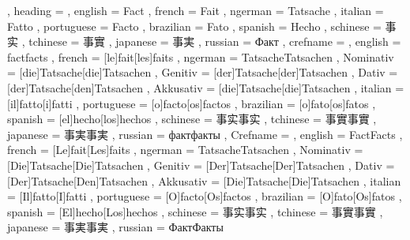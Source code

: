   {
    , heading =   {
                    , english     = Fact
                    , french      = Fait
                    , ngerman     = Tatsache
                    , italian     = Fatto
                    , portuguese  = Facto
                    , brazilian   = Fato
                    , spanish     = Hecho
                    , schinese    = 事实
                    , tchinese    = 事實
                    , japanese    = 事実
                    , russian     = Факт
                  }
    , crefname =  {
                    , english     = {fact}{facts}
                    , french      = [le]{fait}[les]{faits}
                    , ngerman     = { {Tatsache}{Tatsachen}
                                      , Nominativ = [die]{Tatsache}[die]{Tatsachen}
                                      , Genitiv   = [der]{Tatsache}[der]{Tatsachen}
                                      , Dativ     = [der]{Tatsache}[den]{Tatsachen}
                                      , Akkusativ = [die]{Tatsache}[die]{Tatsachen}
                                    }
                    , italian     = [il]{fatto}[i]{fatti}
                    , portuguese  = [o]{facto}[os]{factos}
                    , brazilian   = [o]{fato}[os]{fatos}
                    , spanish     = [el]{hecho}[los]{hechos}
                    , schinese    = {事实}{事实}
                    , tchinese    = {事實}{事實}
                    , japanese    = {事実}{事実}
                    , russian     = {факт}{факты}
                  }
    , Crefname =  {
                    , english     = {Fact}{Facts}
                    , french      = [Le]{fait}[Les]{faits}
                    , ngerman     = { {Tatsache}{Tatsachen}
                                      , Nominativ = [Die]{Tatsache}[Die]{Tatsachen}
                                      , Genitiv   = [Der]{Tatsache}[Der]{Tatsachen}
                                      , Dativ     = [Der]{Tatsache}[Den]{Tatsachen}
                                      , Akkusativ = [Die]{Tatsache}[Die]{Tatsachen}
                                    }
                    , italian     = [Il]{fatto}[I]{fatti}
                    , portuguese  = [O]{facto}[Os]{factos}
                    , brazilian   = [O]{fato}[Os]{fatos}
                    , spanish     = [El]{hecho}[Los]{hechos}
                    , schinese    = {事实}{事实}
                    , tchinese    = {事實}{事實}
                    , japanese    = {事実}{事実}
                    , russian     = {Факт}{Факты}
                  }
  }

